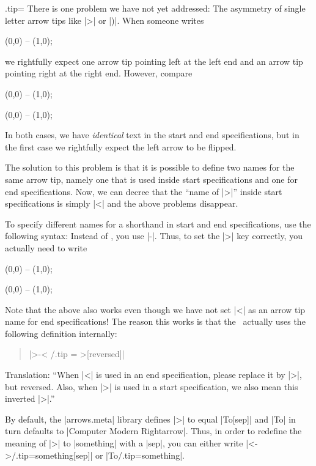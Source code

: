 \begin{handler}{{.tip}{=}}
  There is one problem we have not yet addressed: The asymmetry of
  single letter arrow tips like |>| or |)|. When someone writes 
\begin{codeexample}[]
\tikz \draw [<->] (0,0) -- (1,0);  
\end{codeexample}
  we rightfully expect one arrow tip pointing left at the left end and
  an arrow tip pointing right at the right end. However, compare 
\begin{codeexample}[]
\tikz \draw [>->] (0,0) -- (1,0);  
\end{codeexample}
\begin{codeexample}[]
\tikz {} (0,0) -- (1,0);  
\end{codeexample}
  In both cases, we have \emph{identical} text in the start and end
  specifications, but in the first case we rightfully expect the left
  arrow to be flipped.

  The solution to this problem is that it is possible to define
  two names for the same arrow tip, namely one that is used inside
  start specifications and one for end specifications. Now, we can
  decree that the ``name of |>|'' inside start specifications is
  simply |<| and the above problems disappear.
  
  To specify different names for a shorthand in start and end
  specifications, use the following syntax: Instead of , you
  use |-|. Thus, to set the |>| key correctly, you actually
  need to write
\begin{codeexample}[]
\tikz [<-> /.tip = Stealth] \draw [<->>] (0,0) -- (1,0);  
\end{codeexample}
\begin{codeexample}[]
\tikz [<-> /.tip = Latex] \draw [>-<] (0,0) -- (1,0);  
\end{codeexample}

  Note that the above also works even though we have not set |<| as an
  arrow tip name for end specifications! The reason this works is that
  the \tikzname\ actually uses the following definition internally:
  \begin{quote}
    |>-< /.tip = >[reversed]|
  \end{quote}
  Translation: ``When |<| is used in an end specification, please
  replace it by |>|, but reversed. Also, when |>| is used in a start
  specification, we also mean this inverted |>|.''

  By default, the |arrows.meta| library defines |>| to equal |To[sep]|
  and |To| in turn defaults to |Computer Modern Rightarrow|. Thus, in
  order to redefine the meaning of |>| to |something| with a |sep|,
  you can either write |<->/.tip=something[sep]| or |To/.tip=something|.  
\end{handler}

